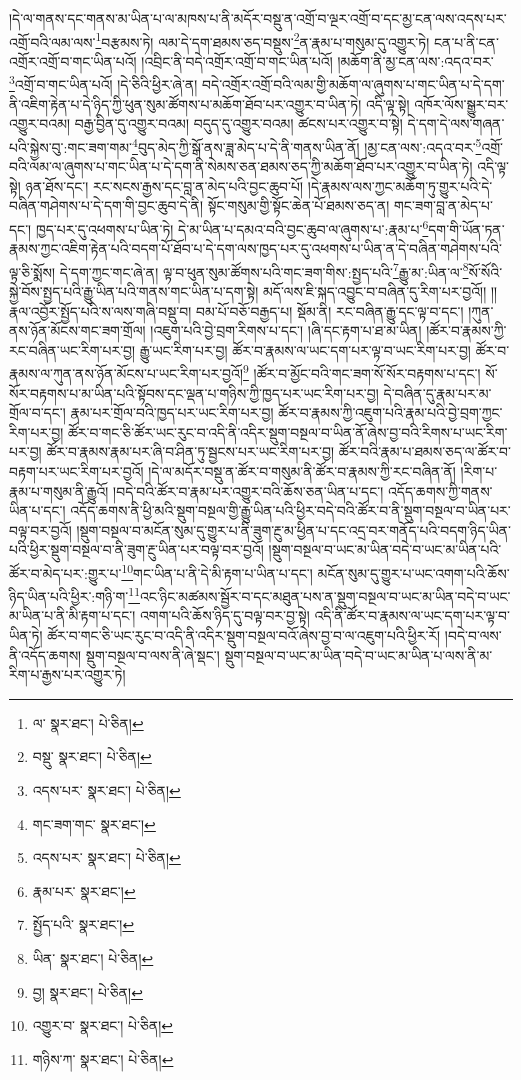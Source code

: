 །དེ་ལ་གནས་དང་གནས་མ་ཡིན་པ་ལ་མཁས་པ་ནི་མདོར་བསྡུ་ན་འགྲོ་བ་ལྔར་འགྲོ་བ་དང་མྱ་ངན་ལས་འདས་པར་འགྲོ་བའི་ལམ་ལས་\footnote{ལ་  སྣར་ཐང་།  པེ་ཅིན། }བརྩམས་ཏེ། ལམ་དེ་དག་ཐམས་ཅད་བསྡུས་\footnote{བསྡུ་  སྣར་ཐང་།  པེ་ཅིན། }ན་རྣམ་པ་གསུམ་དུ་འགྱུར་ཏེ། ངན་པ་ནི་ངན་འགྲོར་འགྲོ་བ་གང་ཡིན་པའོ། །འབྲིང་ནི་བདེ་འགྲོར་འགྲོ་བ་གང་ཡིན་པའོ། །མཆོག་ནི་མྱ་ངན་ལས་:འདའ་བར་\footnote{འདས་པར་  སྣར་ཐང་།  པེ་ཅིན། }འགྲོ་བ་གང་ཡིན་པའོ། །དེ་ཅིའི་ཕྱིར་ཞེ་ན། བདེ་འགྲོར་འགྲོ་བའི་ལམ་གྱི་མཆོག་ལ་ཞུགས་པ་གང་ཡིན་པ་དེ་དག་ནི་འཇིག་རྟེན་པ་དེ་ཉིད་ཀྱི་ཕུན་སུམ་ཚོགས་པ་མཆོག་ཐོབ་པར་འགྱུར་བ་ཡིན་ཏེ། འདི་ལྟ་སྟེ། འཁོར་ལོས་སྒྱུར་བར་འགྱུར་བའམ། བརྒྱ་བྱིན་དུ་འགྱུར་བའམ། བདུད་དུ་འགྱུར་བའམ། ཚངས་པར་འགྱུར་བ་སྟེ། དེ་དག་དེ་ལས་གཞན་པའི་སྐྱེས་བུ་:གང་ཟག་གམ་\footnote{གང་ཟག་གང་  སྣར་ཐང་། }བུད་མེད་ཀྱི་སྒོ་ནས་ཟླ་མེད་པ་དེ་ནི་གནས་ཡིན་ནོ། །མྱ་ངན་ལས་:འདའ་བར་\footnote{འདས་པར་  སྣར་ཐང་།  པེ་ཅིན། }འགྲོ་བའི་ལམ་ལ་ཞུགས་པ་གང་ཡིན་པ་དེ་དག་ནི་སེམས་ཅན་ཐམས་ཅད་ཀྱི་མཆོག་ཐོབ་པར་འགྱུར་བ་ཡིན་ཏེ། འདི་ལྟ་སྟེ། ཉན་ཐོས་དང་། རང་སངས་རྒྱས་དང་བླ་ན་མེད་པའི་བྱང་ཆུབ་པོ། །དེ་རྣམས་ལས་ཀྱང་མཆོག་ཏུ་གྱུར་པའི་དེ་བཞིན་གཤེགས་པ་དེ་དག་གི་བྱང་ཆུབ་དེ་ནི། སྟོང་གསུམ་གྱི་སྟོང་ཆེན་པོ་ཐམས་ཅད་ན། གང་ཟག་བླ་ན་མེད་པ་དང་། ཁྱད་པར་དུ་འཕགས་པ་ཡིན་ཏེ། དེ་མ་ཡིན་པ་དམའ་བའི་བྱང་ཆུབ་ལ་ཞུགས་པ་:རྣམ་པ་\footnote{རྣམ་པར་  སྣར་ཐང་། }དག་གི་ཡོན་ཏན་རྣམས་ཀྱང་འཇིག་རྟེན་པའི་བདག་པོ་ཐོབ་པ་དེ་དག་ལས་ཁྱད་པར་དུ་འཕགས་པ་ཡིན་ན་དེ་བཞིན་གཤེགས་པའི་ལྟ་ཅི་སྨོས། དེ་དག་ཀྱང་གང་ཞེ་ན། ལྟ་བ་ཕུན་སུམ་ཚོགས་པའི་གང་ཟག་གིས་:སྤྱད་པའི་\footnote{སྤྱོད་པའི་  སྣར་ཐང་། }རྒྱུ་མ་:ཡིན་ལ་\footnote{ཡིན་  སྣར་ཐང་།  པེ་ཅིན། }སོ་སོའི་སྐྱེ་བོས་སྤྱད་པའི་རྒྱུ་ཡིན་པའི་གནས་གང་ཡིན་པ་དག་སྟེ། མདོ་ལས་ཇི་སྐད་འབྱུང་བ་བཞིན་དུ་རིག་པར་བྱའོ།། །།རྣལ་འབྱོར་སྤྱོད་པའི་ས་ལས་གཞི་བསྡུ་བ། བམ་པོ་བཅོ་བརྒྱད་པ། སྡོམ་ནི། རང་བཞིན་རྒྱུ་དང་ལྟ་བ་དང་། །ཀུན་ནས་ཉོན་མོངས་གང་ཟག་གྲོལ། །འཇུག་པའི་བྱེ་བྲག་རིགས་པ་དང་། །ཞི་དང་རྟག་པ་ཐ་མ་ཡིན། །ཚོར་བ་རྣམས་ཀྱི་རང་བཞིན་ཡང་རིག་པར་བྱ། རྒྱུ་ཡང་རིག་པར་བྱ། ཚོར་བ་རྣམས་ལ་ཡང་དག་པར་ལྟ་བ་ཡང་རིག་པར་བྱ། ཚོར་བ་རྣམས་ལ་ཀུན་ནས་ཉོན་མོངས་པ་ཡང་རིག་པར་བྱའོ།\footnote{བྱ།  སྣར་ཐང་།  པེ་ཅིན། } །ཚོར་བ་མྱོང་བའི་གང་ཟག་སོ་སོར་བརྟགས་པ་དང་། སོ་སོར་བརྟགས་པ་མ་ཡིན་པའི་སྟོབས་དང་ལྡན་པ་གཉིས་ཀྱི་ཁྱད་པར་ཡང་རིག་པར་བྱ། དེ་བཞིན་དུ་རྣམ་པར་མ་གྲོལ་བ་དང་། རྣམ་པར་གྲོལ་བའི་ཁྱད་པར་ཡང་རིག་པར་བྱ། ཚོར་བ་རྣམས་ཀྱི་འཇུག་པའི་རྣམ་པའི་བྱེ་བྲག་ཀྱང་རིག་པར་བྱ། ཚོར་བ་གང་ཅི་ཚོར་ཡང་རུང་བ་འདི་ནི་འདིར་སྡུག་བསྔལ་བ་ཡིན་ནོ་ཞེས་བྱ་བའི་རིགས་པ་ཡང་རིག་པར་བྱ། ཚོར་བ་རྣམས་རྣམ་པར་ཞི་བ་ཤིན་ཏུ་སྦྱངས་པར་ཡང་རིག་པར་བྱ། ཚོར་བའི་རྣམ་པ་ཐམས་ཅད་ལ་ཚོར་བ་བརྟག་པར་ཡང་རིག་པར་བྱའོ། །དེ་ལ་མདོར་བསྡུ་ན་ཚོར་བ་གསུམ་ནི་ཚོར་བ་རྣམས་ཀྱི་རང་བཞིན་ནོ། །རིག་པ་རྣམ་པ་གསུམ་ནི་རྒྱུའོ། །བདེ་བའི་ཚོར་བ་རྣམ་པར་འགྱུར་བའི་ཆོས་ཅན་ཡིན་པ་དང་། འདོད་ཆགས་ཀྱི་གནས་ཡིན་པ་དང་། འདོད་ཆགས་ནི་ཕྱི་མའི་སྡུག་བསྔལ་གྱི་རྒྱུ་ཡིན་པའི་ཕྱིར་བདེ་བའི་ཚོར་བ་ནི་སྡུག་བསྔལ་བ་ཡིན་པར་བལྟ་བར་བྱའོ། །སྡུག་བསྔལ་བ་མངོན་སུམ་དུ་གྱུར་པ་ནི་ཟུག་རྔུ་མ་ཕྱིན་པ་དང་འདྲ་བར་གནོད་པའི་བདག་ཉིད་ཡིན་པའི་ཕྱིར་སྡུག་བསྔལ་བ་ནི་ཟུག་རྔུ་ཡིན་པར་བལྟ་བར་བྱའོ། །སྡུག་བསྔལ་བ་ཡང་མ་ཡིན་བདེ་བ་ཡང་མ་ཡིན་པའི་ཚོར་བ་མེད་པར་:གྱུར་པ་\footnote{འགྱུར་བ་  སྣར་ཐང་།  པེ་ཅིན། }གང་ཡིན་པ་ནི་དེ་མི་རྟག་པ་ཡིན་པ་དང་། མངོན་སུམ་དུ་གྱུར་པ་ཡང་འགག་པའི་ཆོས་ཉིད་ཡིན་པའི་ཕྱིར་:གཉི་ག་\footnote{གཉིས་ཀ་  སྣར་ཐང་།  པེ་ཅིན། }འང་ཉིང་མཚམས་སྦྱོར་བ་དང་མཐུན་པས་ན་སྡུག་བསྔལ་བ་ཡང་མ་ཡིན་བདེ་བ་ཡང་མ་ཡིན་པ་ནི་མི་རྟག་པ་དང་། འགག་པའི་ཆོས་ཉིད་དུ་བལྟ་བར་བྱ་སྟེ། འདི་ནི་ཚོར་བ་རྣམས་ལ་ཡང་དག་པར་ལྟ་བ་ཡིན་ཏེ། ཚོར་བ་གང་ཅི་ཡང་རུང་བ་འདི་ནི་འདིར་སྡུག་བསྔལ་བའོ་ཞེས་བྱ་བ་ལ་འཇུག་པའི་ཕྱིར་རོ། །བདེ་བ་ལས་ནི་འདོད་ཆགས། སྡུག་བསྔལ་བ་ལས་ནི་ཞེ་སྡང་། སྡུག་བསྔལ་བ་ཡང་མ་ཡིན་བདེ་བ་ཡང་མ་ཡིན་པ་ལས་ནི་མ་རིག་པ་རྒྱས་པར་འགྱུར་ཏེ། 